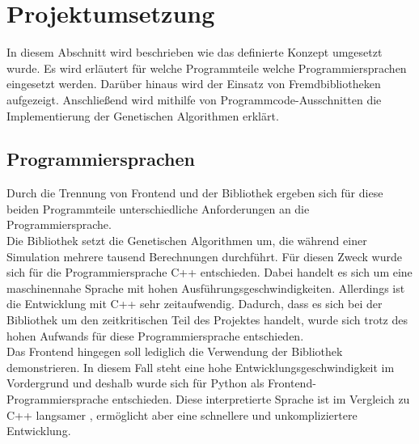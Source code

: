 
\section{Projektumsetzung}
In diesem Abschnitt wird beschrieben wie das definierte Konzept umgesetzt wurde.
Es wird erläutert für welche Programmteile welche Programmiersprachen eingesetzt werden. Darüber hinaus wird der Einsatz von Fremdbibliotheken aufgezeigt.
Anschließend wird mithilfe von  Programmcode-Ausschnitten die Implementierung der Genetischen Algorithmen erklärt.

\subsection{Programmiersprachen}
Durch die Trennung von Frontend und der Bibliothek ergeben sich für diese beiden Programmteile unterschiedliche Anforderungen an die Programmiersprache.\\
Die Bibliothek setzt die Genetischen Algorithmen um, die während einer Simulation mehrere tausend Berechnungen durchführt. Für diesen Zweck wurde sich für die Programmiersprache C++ entschieden.
Dabei handelt es sich um eine maschinennahe Sprache mit hohen Ausführungsgeschwindigkeiten. Allerdings ist die Entwicklung mit C++ sehr zeitaufwendig. Dadurch, dass es sich bei der Bibliothek um den zeitkritischen Teil des Projektes handelt, 
wurde sich trotz des hohen Aufwands für diese Programmiersprache entschieden.\\
Das Frontend hingegen soll lediglich die Verwendung der Bibliothek demonstrieren. In diesem Fall steht eine hohe Entwicklungsgeschwindigkeit im Vordergrund und deshalb wurde sich für Python als Frontend-Programmiersprache entschieden. 
Diese interpretierte Sprache ist im Vergleich zu C++ langsamer \cite{benchmarks}, ermöglicht aber eine schnellere und unkompliziertere Entwicklung.


